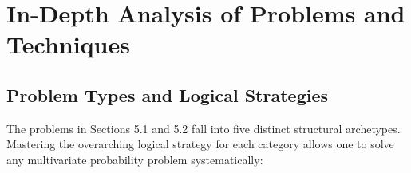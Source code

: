 \documentclass[11pt, letterpaper]{article}
\theoremstyle{definition}
\theoremstyle{remark}
\begin{document}
\newpage
\section{In-Depth Analysis of Problems and Techniques}

\subsection{Problem Types and Logical Strategies}

The problems in Sections 5.1 and 5.2 fall into five distinct structural archetypes. Mastering the overarching logical strategy for each category allows one to solve any multivariate probability problem systematically:
\end{document}
